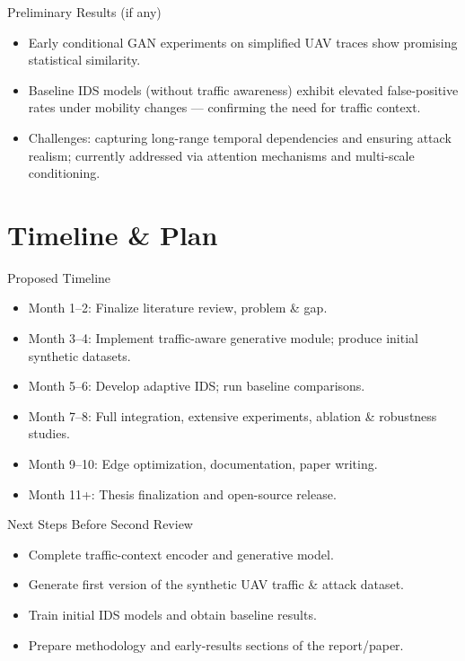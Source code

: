 \documentclass[10pt]{beamer}
\begin{document}
\begin{frame}{Preliminary Results (if any)}
    \begin{itemize}
        \item Early conditional GAN experiments on simplified UAV traces show promising statistical similarity.
        \item Baseline IDS models (without traffic awareness) exhibit elevated false-positive rates under mobility changes — confirming the need for traffic context.
        \item Challenges: capturing long-range temporal dependencies and ensuring attack realism; currently addressed via attention mechanisms and multi-scale conditioning.
    \end{itemize}
\end{frame}

\section{Timeline \& Plan}
\begin{frame}{Proposed Timeline}
    \begin{itemize}
        \item Month 1–2: Finalize literature review, problem \& gap.
        \item Month 3–4: Implement traffic-aware generative module; produce initial synthetic datasets.
        \item Month 5–6: Develop adaptive IDS; run baseline comparisons.
        \item Month 7–8: Full integration, extensive experiments, ablation \& robustness studies.
        \item Month 9–10: Edge optimization, documentation, paper writing.
        \item Month 11+: Thesis finalization and open-source release.
    \end{itemize}
\end{frame}

\begin{frame}{Next Steps Before Second Review}
    \begin{itemize}
        \item Complete traffic-context encoder and generative model.
        \item Generate first version of the synthetic UAV traffic \& attack dataset.
        \item Train initial IDS models and obtain baseline results.
        \item Prepare methodology and early-results sections of the report/paper.
    \end{itemize}
\end{frame}
\end{document}

